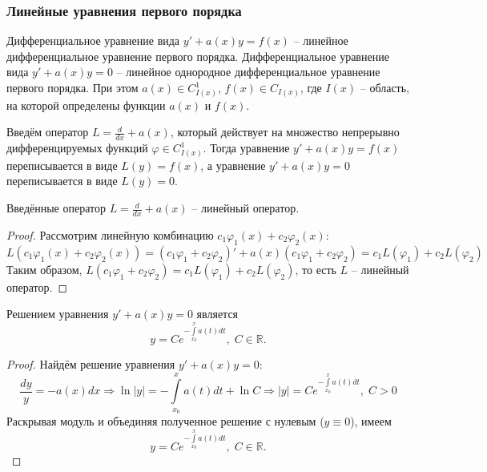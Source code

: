     \subsubsection{Линейные уравнения первого порядка}

    \begin{definition}
        Дифференциальное уравнение вида $y' + a(x) y = f(x)$ -- линейное дифференциальное уравнение первого порядка. Дифференциальное уравнение вида $y' + a(x) y = 0$ -- линейное однородное дифференциальное уравнение первого порядка. При этом $a(x) \in C_{I(x)}^1$, $f(x) \in C_{I(x)}$, где $I(x)$ -- область, на которой определены функции $a(x)$ и $f(x)$. 
    \end{definition}

    Введём оператор $L = \frac{d}{dx} + a(x)$, который действует на множество непрерывно дифференцируемых функций $\varphi \in C^1_{I(x)}$. Тогда уравнение $y' + a(x) y = f(x)$ переписывается в виде $L(y) = f(x)$, а уравнение $y' + a(x) y = 0$ переписывается в виде $L(y) = 0$.

    \begin{theorem}
        Введённые оператор $L = \frac{d}{dx} + a(x)$ -- линейный оператор.
    \end{theorem}

    \begin{proof}
        Рассмотрим линейную комбинацию $c_1 \varphi_1(x) + c_2 \varphi_2(x)$:
        \begin{equation*}
            L(c_1 \varphi_1(x) + c_2 \varphi_2(x)) = (c_1 \varphi_1 + c_2 \varphi_2)' + a(x) (c_1 \varphi_1 + c_2 \varphi_2) = c_1 L(\varphi_1) + c_2 L(\varphi_2)
        \end{equation*}
        Таким образом, $L(c_1 \varphi_1 + c_2 \varphi_2) = c_1 L(\varphi_1) + c_2 L(\varphi_2)$, то есть $L$ -- линейный оператор.
    \end{proof}

    \begin{proposition}
        Решением уравнения $y' + a(x) y = 0$ является
        \begin{equation*}
            y = C e^{-\int\limits_{x_0}^{x} a(t) dt}, \; C \in \mathbb{R}.
        \end{equation*}
    \end{proposition}

    \begin{proof}
        Найдём решение уравнения $y' + a(x) y = 0$: 
        \begin{equation*}
            \frac{dy}{y} = -a(x) dx \Rightarrow \ln |y| = - \int\limits_{x_0}^{x} a(t) dt + \ln C \Rightarrow |y| = C e^{-\int\limits_{x_0}^{x} a(t) dt}, \; C > 0
        \end{equation*}
        Раскрывая модуль и объединяя полученное решение с нулевым ($y \equiv 0$), имеем
        \begin{equation*}
            y = C e^{-\int\limits_{x_0}^{x} a(t) dt}, \; C \in \mathbb{R}.
        \end{equation*}
    \end{proof}


